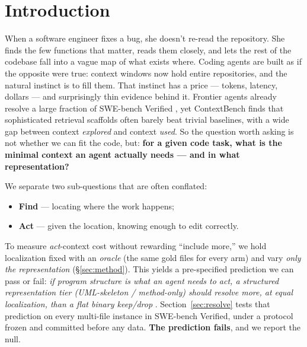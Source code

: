 \documentclass{article}
\begin{document}
\section{Introduction}
\label{sec:intro}

When a software engineer fixes a bug, she doesn't re-read the repository. She finds the few
functions that matter, reads them closely, and lets the rest of the codebase fall into a vague map
of what exists where. Coding agents are built as if the opposite were true: context windows now
hold entire repositories, and the natural instinct is to fill them. That instinct has a
price --- tokens, latency, dollars --- and surprisingly thin evidence behind it. Frontier agents
already resolve a large fraction of SWE-bench Verified \citep{swebench}, yet ContextBench
\citep{contextbench} finds that sophisticated retrieval scaffolds often barely beat trivial
baselines, with a wide gap between context \emph{explored} and context \emph{used}. So the
question worth asking is not whether we can fit the code, but: \textbf{for a given code task, what
is the minimal context an agent actually needs --- and in what representation?}

We separate two sub-questions that are often conflated:
\begin{itemize}
  \item \textbf{Find} --- locating where the work happens;
  \item \textbf{Act} --- given the location, knowing enough to edit correctly.
\end{itemize}

To measure \emph{act}-context cost without rewarding ``include more,'' we hold localization fixed
with an \emph{oracle} (the same gold files for every arm) and vary \emph{only the representation}
(\S\ref{sec:method}). This yields a pre-specified prediction we can pass or fail: \emph{if program
structure is what an agent needs to act, a structured representation tier (UML-skeleton /
method-only) should resolve more, at equal localization, than a flat binary keep/drop}
\citep{swezze}. Section~\ref{sec:resolve} tests that prediction on every multi-file instance in
SWE-bench Verified, under a protocol frozen and committed before any data. \textbf{The prediction
fails}, and we report the null.
\end{document}
